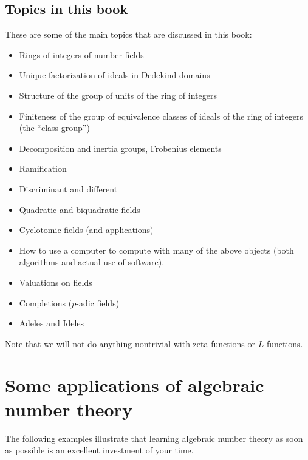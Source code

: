 \subsection{Topics in this book}
These are some of the main topics that are discussed in this book:
\begin{itemize}\setlength{\itemsep}{-.7ex}
\item Rings of integers of number fields
\item Unique factorization of ideals in Dedekind domains
\item Structure of the group of units of the ring of integers
\item Finiteness of the group of equivalence classes
of ideals of the ring of integers (the ``class group'')
\item Decomposition and inertia groups, Frobenius elements
\item Ramification
\item Discriminant and different
\item Quadratic and biquadratic fields
\item Cyclotomic fields (and applications)
\item How to use a computer to compute with many of the above 
objects (both algorithms and actual use of software).
\item Valuations on fields
\item Completions ($p$-adic fields)
\item Adeles and Ideles
\end{itemize}
Note that we will not do anything nontrivial with zeta functions or
$L$-functions. 



\section{Some applications of algebraic number theory}
The following examples illustrate that learning algebraic number
theory as soon as possible is an excellent investment of your time.

